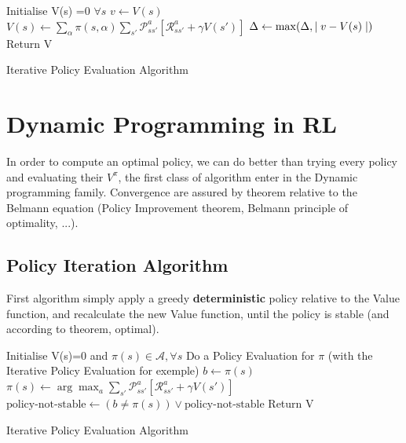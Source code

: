 		\begin{algorithm}[H]
				Initialise V(s) =0 $\forall s$ \;
				{
					{
						$v \leftarrow V(s)$ \;
						$V(s) \leftarrow \sum_\alpha \pi(s, \alpha) \sum_{s'} \mathcal{P}^a_{ss'}[\mathcal{R}^a_{ss'} + \gamma V(s')]$ \;
						$\Delta \leftarrow \max(\Delta, \mid v - V(s)\mid) $ \;
					}
				}
				Return V
				\caption{Iterative Policy Evaluation Algorithm}
			\end{algorithm}


\section{Dynamic Programming in RL} %
	\label{sec:dynamic_programming_in_rl}

	In order to compute an optimal policy, we can do better than trying every policy and evaluating their $V^{\pi}$, the first class of algorithm enter in the Dynamic programming family. Convergence are assured by theorem relative to the Belmann equation (Policy Improvement theorem, Belmann principle of optimality, ...).
	\subsection{Policy Iteration Algorithm} %
		\label{sub:policy_iteration_algorithm}
		
		First algorithm simply apply a greedy \textbf{deterministic} policy relative to the Value function, and recalculate the new Value function, until the policy is stable (and according to theorem, optimal).


		\begin{algorithm}[H]
				Initialise V(s)=0 and $\pi(s) \in \mathcal{A},  \forall s$ \;
				{
					Do a Policy Evaluation for $\pi$ (with the Iterative Policy Evaluation for exemple)
					{
						$b \leftarrow \pi(s)$ \;
						$\pi(s) \leftarrow \arg \max_a \sum_{s'} \mathcal{P}^a_{ss'}[\mathcal{R}^a_{ss'} + \gamma V(s')]$ \;
						$\text{policy-not-stable} \leftarrow (b \neq \pi(s) )\vee \text{policy-not-stable} $ 
					}
				}
				Return V
				\caption{Iterative Policy Evaluation Algorithm}
			\end{algorithm}

